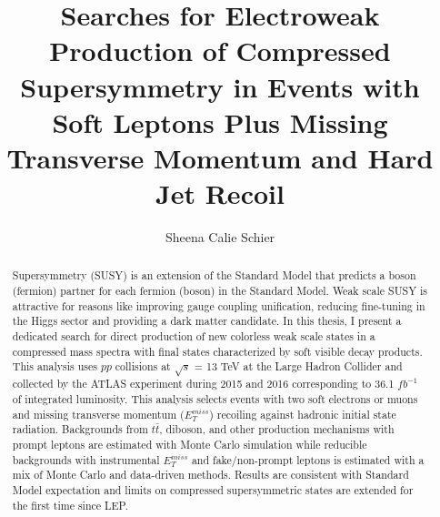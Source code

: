 \documentclass[11pt]{ucthesis}
\begin{document}

\title{Searches for Electroweak Production of Compressed Supersymmetry in Events with Soft Leptons Plus Missing Transverse Momentum and Hard Jet Recoil}
\author{Sheena Calie Schier}
\deanlinethree{}

\begin{frontmatter}

\maketitle
\copyrightpage

\tableofcontents
\listoffigures
\listoftables

\makeatletter
\newcommand{\rmnum}[1]{\romannumeral #1}
\newcommand{\Rmnum}[1]{\expandafter\@slowromancap\romannumeral #1@}
\makeatother

\begin{abstract}
Supersymmetry (SUSY) is an extension of the Standard Model that predicts a boson (fermion) partner for each fermion (boson) in the Standard Model. Weak scale SUSY is attractive for reasons like improving gauge coupling unification, reducing fine-tuning in the Higgs sector and providing a dark matter candidate. In this thesis, I present a dedicated search for direct production of new colorless weak scale states in a compressed mass spectra with final states characterized by soft visible decay products. This analysis uses $pp$ collisions at $\sqrt s$ = 13 TeV at the Large Hadron Collider and collected by the ATLAS experiment during 2015 and 2016 corresponding to 36.1 $fb^{-1}$ of integrated luminosity. This analysis selects events with two soft electrons or muons and missing transverse momentum ($E_T^{miss}$) recoiling against hadronic initial state radiation. Backgrounds from $t\bar{t}$, diboson, and other production mechanisms with prompt leptons are estimated with Monte Carlo
simulation while reducible backgrounds with instrumental $E_T^{miss}$ and fake/non-prompt leptons is estimated with a mix of Monte Carlo and data-driven methods. Results are consistent with Standard Model expectation and limits on compressed supersymmetric states are extended for the first time since LEP.


\end{abstract}
\end{frontmatter}
\end{document}
